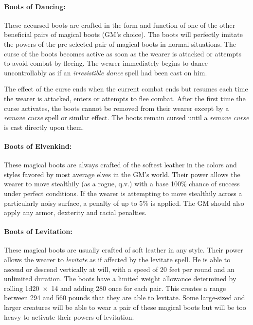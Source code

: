 \begin{multicols}{2}
\begin{minipage}{\columnwidth}
\end{minipage}

\paragraph{Boots of Dancing:} These accursed boots are crafted in the form and function of one of the other beneficial pairs of magical boots (GM's choice).  The boots will perfectly imitate the powers of the pre-selected pair of magical boots in normal situations.  The curse of the boots becomes active as soon as the wearer is attacked or attempts to avoid combat by fleeing.  The wearer immediately begins to dance uncontrollably as if an \textit{irresistible dance} spell had been cast on him.

The effect of the curse ends when the current combat ends but resumes each time the wearer is attacked, enters or attempts to flee combat.  After the first time the curse activates, the boots cannot be removed from their wearer except by a \textit{remove curse} spell or similar effect.  The boots remain cursed until a \textit{remove curse} is cast directly upon them.

\paragraph{Boots of Elvenkind:} These magical boots are always crafted of the softest leather in the colors and styles favored by most average elves in the GM's world.  Their power allows the wearer to move stealthily (as a rogue, q.v.) with a base 100\% chance of success under perfect conditions.  If the wearer is attempting to move stealthily across a particularly noisy surface, a penalty of up to 5\% is applied.  The GM should also apply any armor, dexterity and racial penalties. 

\paragraph{Boots of Levitation:} These magical boots are usually crafted of soft leather in any style.  Their power allows the wearer to \textit{levitate} as if affected by the levitate spell.  He is able to ascend or descend vertically at will, with a speed of 20 feet per round and an unlimited duration.  The boots have a limited weight allowance determined by rolling 1d20~$\times$~14 and adding 280 once for each pair.  This creates a range between 294 and 560 pounds that they are able to levitate.  Some large-sized and larger creatures will be able to wear a pair of these magical boots but will be too heavy to activate their powers of levitation.  


\end{multicols}
